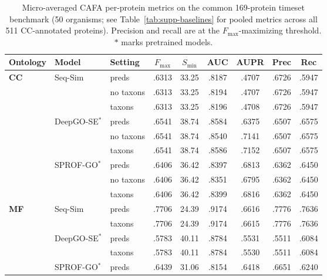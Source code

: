 \begin{table}[!h]
\centering
\caption{Micro-averaged CAFA per-protein metrics on the common 169-protein timeset benchmark (50 organisms; see Table~\ref{tab:supp-baselines} for pooled metrics across all 511 CC-annotated proteins). Precision and recall are at the $F_{\max}$-maximizing threshold. $\ast$ marks pretrained models.}
\label{tab:micro-avg-preds-timeset}
\small
\setlength{\tabcolsep}{4pt}
\begin{tabular}{lll*{6}c}
\toprule
Ontology & Model & Setting & $F_{\max}$ & $S_{\min}$ & AUC & AUPR & Prec & Rec \\
\midrule
\textbf{CC} & Seq-Sim                 & preds      & .6313 & 33.25 & .8187 & .4707 & .6726 & .5947 \\
            &                         & no taxons  & .6313 & 33.25 & .8194 & .4707 & .6726 & .5947 \\
            &                         & taxons     & .6313 & 33.25 & .8196 & .4708 & .6726 & .5947 \\
            & DeepGO-SE$^\ast$         & preds      & .6541 & 38.74 & .8584 & .6375 & .6507 & .6575 \\
            &                         & no taxons  & .6541 & 38.74 & .8540 & .7141 & .6507 & .6575 \\
            &                         & taxons     & .6541 & 38.74 & .8586 & .7152 & .6507 & .6575 \\
            & SPROF-GO$^\ast$          & preds      & .6406 & 36.42 & .8397 & .6813 & .6362 & .6450 \\
            &                         & no taxons  & .6406 & 36.42 & .8351 & .6795 & .6362 & .6450 \\
            &                         & taxons     & .6406 & 36.42 & .8399 & .6816 & .6362 & .6450 \\
\midrule
\textbf{MF} & Seq-Sim                 & preds      & .7706 & 24.39 & .9174 & .6616 & .7776 & .7636 \\
            &                         & taxons     & .7706 & 24.39 & .9174 & .6615 & .7776 & .7636 \\
            & DeepGO-SE$^\ast$         & preds      & .5783 & 40.11 & .8784 & .5531 & .5511 & .6084 \\
            &                         & taxons     & .5783 & 40.11 & .8784 & .5530 & .5511 & .6084 \\
            & SPROF-GO$^\ast$          & preds      & .6439 & 31.06 & .8154 & .6418 & .6651 & .6240 \\

\end{tabular}
\end{table}
